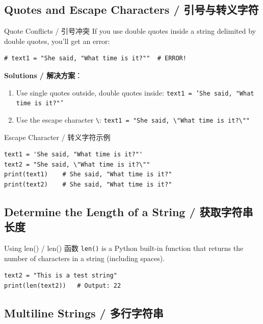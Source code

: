 \documentclass[11pt,a4paper]{report}
\let\oldtexttt\texttt
\renewcommand{\texttt}[1]{\textcolor{mainblue}{\oldtexttt{#1}}}
\begin{document}
\subsection{Quotes and Escape Characters / 引号与转义字符}

\begin{warning}{Quote Conflicts / 引号冲突}
    If you use double quotes inside a string delimited by double quotes, you'll get an error:
    \begin{lstlisting}
# text1 = "She said, "What time is it?""  # ERROR!
    \end{lstlisting}
    \textbf{Solutions / 解决方案}：
    \begin{enumerate}
        \item Use single quotes outside, double quotes inside:
        \texttt{text1 = 'She said, "What time is it?"'}
        \item Use the escape character \texttt{\textbackslash}:
        \texttt{text1 = "She said, \textbackslash"What time is it?\textbackslash""}
    \end{enumerate}
\end{warning}

\begin{examplebox}{Escape Character / 转义字符示例}
\begin{lstlisting}
text1 = 'She said, "What time is it?"'
text2 = "She said, \"What time is it?\""
print(text1)    # She said, "What time is it?"
print(text2)    # She said, "What time is it?"
\end{lstlisting}
\end{examplebox}

\subsection{Determine the Length of a String / 获取字符串长度}

\begin{examplebox}{Using len() / len() 函数}
    \texttt{len()} is a Python built-in function that returns the number of characters in a string (including spaces).
\begin{lstlisting}
text2 = "This is a test string"
print(len(text2))   # Output: 22
\end{lstlisting}
\end{examplebox}

\subsection{Multiline Strings / 多行字符串}
\end{document}
